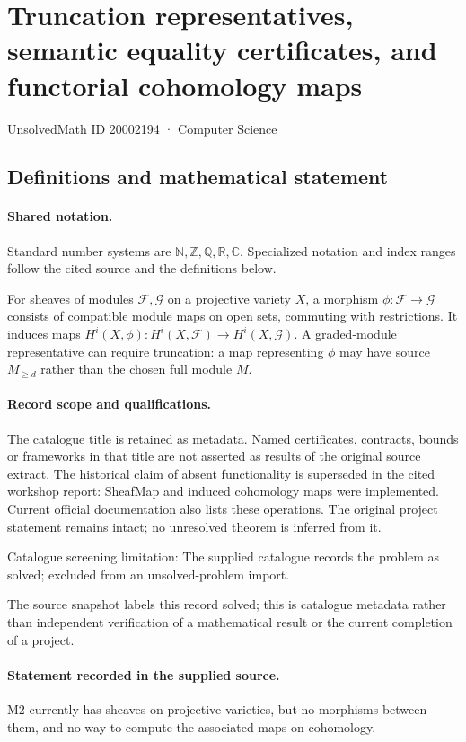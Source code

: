 \documentclass[11pt]{article}
\begin{document}
\setcounter{section}{20002193}
\section{Truncation representatives, semantic equality certificates, and functorial cohomology maps}\label{20002194}
{\small\sffamily UnsolvedMath ID 20002194 · Computer Science}
\subsection{Definitions and mathematical statement}

\paragraph{Shared notation.}Standard number systems are $\mathbb N,\mathbb Z,\mathbb Q,\mathbb R,\mathbb C$. Specialized notation and index ranges follow the cited source and the definitions below.


For sheaves of modules $\mathcal F,\mathcal G$ on a projective variety $X$, a morphism $\phi:\mathcal F\to\mathcal G$ consists of compatible module maps on open sets, commuting with restrictions. It induces maps $H^i(X,\phi):H^i(X,\mathcal F)\to H^i(X,\mathcal G)$. A graded-module representative can require truncation: a map representing $\phi$ may have source $M_{\geq d}$ rather than the chosen full module $M$.
\paragraph{Record scope and qualifications.}
The catalogue title is retained as metadata. Named certificates, contracts, bounds or frameworks in that title are not asserted as results of the original source extract.
The historical claim of absent functionality is superseded in the cited workshop report: SheafMap and induced cohomology maps were implemented. Current official documentation also lists these operations. The original project statement remains intact; no unresolved theorem is inferred from it.

Catalogue screening limitation: The supplied catalogue records the problem as solved; excluded from an unsolved-problem import.

The source snapshot labels this record solved; this is catalogue metadata rather than independent verification of a mathematical result or the current completion of a project.
\paragraph{Statement recorded in the supplied source.}
M2 currently has sheaves on projective varieties, but no morphisms between them, and no way to compute the associated maps on cohomology.
\end{document}
